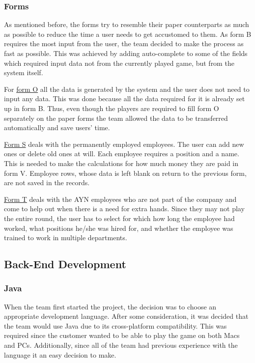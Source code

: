 \documentclass{l3proj}
\begin{document}
\subsubsection{Forms}
As mentioned before, the forms try to resemble their paper counterparts as much as possible to reduce the time a user needs to get accustomed to them. As form B requires the most input from the user, the team decided to make the process as fast as possible. This was achieved by adding auto-complete to some of the fields which required input data not from the currently played game, but from the system itself.

For \hyperref[fig:FormO]{form O}  all the data is generated by the system and the user does not need to input any data. This was done because all the data required for it is already set up in form B. Thus, even though the players are required to fill form O separately on the paper forms the team allowed the data to be transferred automatically and save users' time.

\hyperref[fig:FormS]{Form S}  deals with the permanently employed employees. The user can add new ones or delete old ones at will. Each employee requires a position and a name. This is needed to make the calculations for how much money they are paid in form V. Employee rows, whose data is left blank on return to the previous form, are not saved in the records.

\hyperref[fig:FormT]{Form T} deals with the AYN employees who are not part of the company and come to help out when there is a need for extra hands. Since they may not play the entire round, the user has to select for which how long the employee had worked, what positions he/she was hired for, and whether the employee was trained to work in multiple departments.

\subsection{Back-End Development}
\subsubsection{Java}
When the team first started the project, the decision was to choose an appropriate development language. After some consideration, it was decided that the team would use Java due to its cross-platform compatibility. This was required since the customer wanted to be able to play the game on both Macs and PCs. Additionally, since all of the team had previous experience with the language it an easy decision to make.
\end{document}
